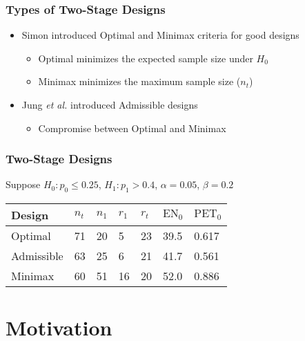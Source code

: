 \documentclass{beamer}\usepackage[]{graphicx}\usepackage[]{color}
\begin{document}
\begin{frame}
\frametitle{Types of Two-Stage Designs}
    \begin{itemize}
        \item Simon introduced Optimal and Minimax criteria for good designs
          \begin{itemize}
             \item Optimal minimizes the expected sample size under $H_0$
             \item Minimax minimizes the maximum sample size ($n_t$)
          \end{itemize}
        \item Jung \textit{et al.} introduced Admissible designs
            \begin{itemize}
              \item Compromise between Optimal and Minimax
            \end{itemize}
    \end{itemize}
\end{frame}

\begin{frame}
\frametitle{Two-Stage Designs}
 Suppose $H_0: p_0 \leq 0.25$, $H_1: p_1 > 0.4$, $\alpha = 0.05$, $\beta = 0.2$

\begin{table}[]
\centering
\begin{tabular}{l|llllll}
Design     & $n_t$ & $n_1$ & $r_1$ & $r_t$ & $\mbox{EN}_0$    & $\mbox{PET}_0$ \\ \hline
Optimal    & 71      &  20     &   5    &   23    &      39.5      &    0.617            \\
Admissible &  63     &   25    &   6    &   21    &     41.7     &     0.561          \\
Minimax    &  60     &  51     &   16    &   20    &    52.0          &      0.886          \\
\end{tabular}
\end{table}
\end{frame}

\section{Motivation}
\end{document}
